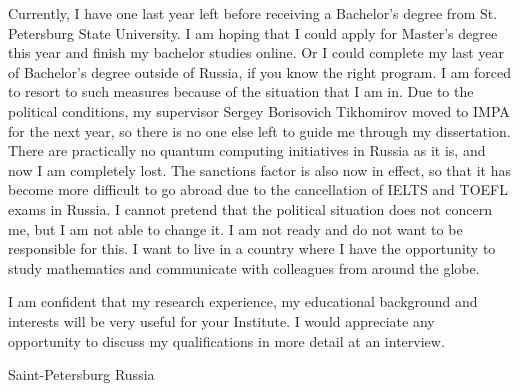 \documentclass[11pt,a4paper,sans]{moderncv}        %
\begin{document}
	Currently, I have one last year left before receiving a Bachelor's degree from St. Petersburg State University. I am hoping that I could apply for Master's degree this year and finish my bachelor studies online. Or I could complete my last year of Bachelor's degree outside of Russia, if you know the right program. I am forced to resort to such measures because of the situation that I am in. Due to the political conditions, my supervisor Sergey Borisovich Tikhomirov moved to IMPA for the next year, so there is no one else left to guide me through my dissertation. There are practically no quantum computing initiatives in Russia as it is, and now I am completely lost. The sanctions factor is also now in effect, so that it has become more difficult to go abroad due to the cancellation of IELTS and TOEFL exams in Russia. I cannot pretend that the political situation does not concern me, but I am not able to change it. I am not ready and do not want to be responsible for this. I want to live in a country where I have the opportunity to study mathematics and communicate with colleagues from around the globe.
	
	I am confident that my research experience, my educational background and interests will be very useful for your Institute. I would appreciate any opportunity to discuss my qualifications in more detail at an interview.
	
	\vspace*{\fill}
	\title{}
	\address{Novoizmailovsky prospect, 16k8}{Saint-Petersburg}{ Russia }
	\makeletterclosing
	\name{}{}
\end{document}
